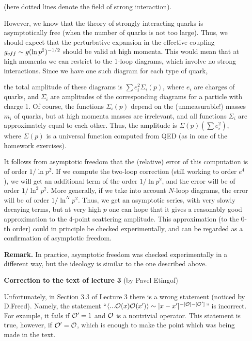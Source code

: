 \documentclass[11pt]{article}
\begin{document}
(here dotted lines denote the field of strong 
interaction).
   
However, we know that the theory of strongly interacting quarks
is asymptotically free (when the number of quarks is not too large). 
Thus, we should expect that the perturbative expansion in 
the effective coupling $g_{\text eff}\sim g(\ln p^2)^{-1/2}$ 
should be valid at high momenta. This would mean that at high 
momenta we can restrict to the 1-loop diagrams, which involve no
strong interactions.   
Since we have one such diagram for each type of quark, 

\begin{center}
\end{center}

the total amplitude
of these diagrams is $\sum e_i^2\Sigma_i(p)$, where
$e_i$ are charges of quarks, and $\Sigma_i$ are amplitudes of 
the corresponding diagrams for a particle with charge 1. 
Of course, the functions $\Sigma_i(p)$ depend on the (unmeasurable!)
masses $m_i$ of quarks, but at high momenta masses are irrelevant,
and all functions $\Sigma_i$ are approximately equal 
to each other. 
Thus, the amplitude is $\Sigma(p)(\sum e_i^2)$, where 
$\Sigma(p)$ is a universal function computed from QED
(as in one of the homework exercises).

It follows from asymptotic freedom that 
the (relative) error of this computation is of order $1/\ln p^2$. 
If we compute the two-loop correction
(still working to order $e^4$),
we will get an additional term of the order $1/\ln p^2$, and
the error will be of order $1/\ln^2p^2$. 
More generally, if we take into account $N$-loop diagrams, 
the error will be of order $1/\ln^Np^2$.
Thus, we get an asymptotic series, with very slowly decaying terms, 
but at very high $p$ one can hope that it gives a reasonably good approximation
to the 4-point scattering amplitude. 
This approximation (to the 0-th order) could in principle be checked 
experimentally, and can be regarded as a confirmation of asymptotic
freedom. 

{\bf Remark.} In practice, asymptotic freedom was checked experimentally
in a different way, but the ideology is similar to the one described
above. 

{\bf Correction to the text of lecture 3} (by Pavel Etingof)

Unfortunately, in Section 3.3 of Lecture 3 there is a
wrong statement (noticed by D.Freed). Namely, the statement 
``$\langle...{\cal O}(x){\cal O}(x')\rangle\sim |x-x'|^{-[{\cal O}]-[{\cal O}']}$'' is incorrect.
 For example, it fails
if ${\cal O}'=1$ and ${\cal O}$ is a nontrivial operator. 
This statement is
true, however, if ${\cal O}'={\cal O}$, which is enough to make the point 
which was being made in the text. 
\end{document}
